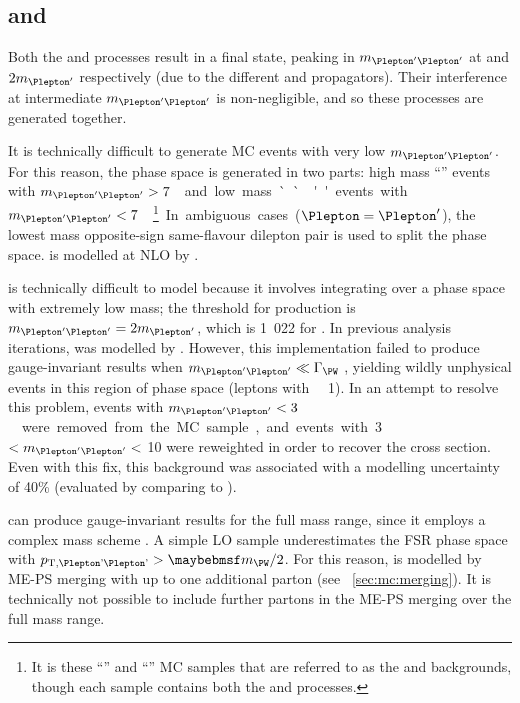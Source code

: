 \subsection{\WZ and \Wgstar}
\label{sec:diboson:wgstar}

Both the \WZ and \Wgstar processes result in a  
final state, peaking in $m_{\HepProcess{\Plepton'\Plepton'}}$ at \mZ and 
$2m_{\Plepton'}$ respectively (due to the different \PZ and \Pphoton propagators). Their 
interference at intermediate $m_{\HepProcess{\Plepton'\Plepton'}}$ is non-negligible, and 
so these processes are generated together.

It is technically difficult to generate MC events with very low 
$m_{\HepProcess{\Plepton'\Plepton'}}$. For this reason, the phase space is generated in two 
parts: high mass ``\WZ'' events with \unit{$m_{\HepProcess{\Plepton'\Plepton'}} > 7$}{\GeV} 
and low mass ``\Wgstar'' events with 
\unit{$m_{\HepProcess{\Plepton'\Plepton'}} < 7$}{\GeV}.\footnote{
	It is these ``\WZ'' and ``\Wgstar''	MC samples that are referred to as the \WZ and 
	\Wgstar backgrounds, though each sample contains both the \WZ and \Wgstar processes.
}
In ambiguous cases ($\Plepton = \Plepton'$), the lowest mass opposite-sign same-flavour 
dilepton pair is used to split the phase space. \WZ is modelled at NLO by 
.

\Wgstar is technically difficult to model because it involves integrating over a phase 
space with extremely low mass; the threshold for production is 
$m_{\HepProcess{\Plepton'\Plepton'}} = 2m_{\Plepton'}$, which is \unit{1.022}{\MeV} for 
\HepProcess{\Plepton\Pnu\Pe\Pe}. In previous analysis iterations, \Wgstar was modelled by 
 \cite{HWW-Moriond}. However, this implementation failed to 
produce gauge-invariant results when $m_{\HepProcess{\Plepton'\Plepton'}} \ll \Gamma_{\PW}$ 
\cite{MadGraph:Wgstar}, yielding wildly unphysical events in this region of phase space 
(\eg leptons with \unit{\pt~\about~1}{\TeV}). In an attempt to resolve this problem, events 
with \unit{$m_{\HepProcess{\Plepton'\Plepton'}} < 3$}{\MeV} were removed from the MC 
sample, and events with \unit{3}{\MeV} $< m_{\HepProcess{\Plepton'\Plepton'}} <$ 
\unit{10}{\MeV} were reweighted in order to recover the cross section. Even with this fix, 
this background was associated with a modelling uncertainty of 40\% (evaluated by comparing 
to \sherpa).

\sherpa can produce gauge-invariant results for the full mass range, since it employs a 
complex mass scheme \cite{Sherpa:Wgstar}. A simple LO \sherpa sample underestimates the FSR 
phase space with $p_{\text{T,\HepProcess{\Plepton'\Plepton'}}} > \mW/2$. For this reason, 
\Wgstar is modelled by ME-PS merging with up to one additional parton (see 
\Section~\ref{sec:mc:merging}). It is technically not possible to include further partons 
in the ME-PS merging over the full mass range.

